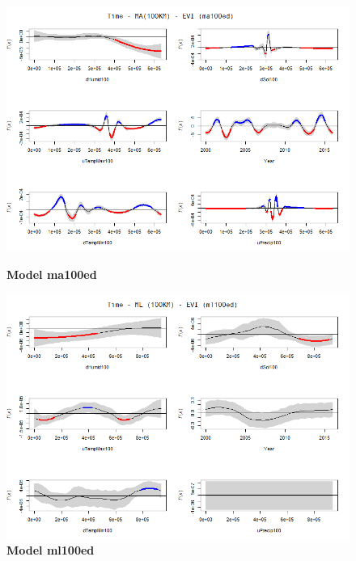 \begin{figure}[H]
 \centering
    \begin{minipage}{0.8\textwidth}
        \centering
        \includegraphics[width=1.2\textwidth]{ma100ed.png} %
        \caption{\textbf{Model ma100ed}}
    \end{minipage}\hfill
    \begin{minipage}{0.8\textwidth}
        \centering
        \includegraphics[width=1.2\textwidth]{ml100ed.png} %
        \caption{\textbf{Model ml100ed}}
    \end{minipage}
\end{figure}


